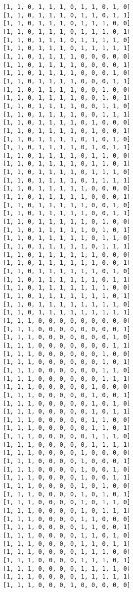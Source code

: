 \documentclass[11pt]{article}
\begin{document}
\begin{Verbatim}[commandchars=\\\{\}]
[1, 1, 0, 1, 1, 1, 0, 1, 1, 0, 1, 0]
[1, 1, 0, 1, 1, 1, 0, 1, 1, 0, 1, 1]
[1, 1, 0, 1, 1, 1, 0, 1, 1, 1, 0, 0]
[1, 1, 0, 1, 1, 1, 0, 1, 1, 1, 0, 1]
[1, 1, 0, 1, 1, 1, 0, 1, 1, 1, 1, 0]
[1, 1, 0, 1, 1, 1, 0, 1, 1, 1, 1, 1]
[1, 1, 0, 1, 1, 1, 1, 0, 0, 0, 0, 0]
[1, 1, 0, 1, 1, 1, 1, 0, 0, 0, 0, 1]
[1, 1, 0, 1, 1, 1, 1, 0, 0, 0, 1, 0]
[1, 1, 0, 1, 1, 1, 1, 0, 0, 0, 1, 1]
[1, 1, 0, 1, 1, 1, 1, 0, 0, 1, 0, 0]
[1, 1, 0, 1, 1, 1, 1, 0, 0, 1, 0, 1]
[1, 1, 0, 1, 1, 1, 1, 0, 0, 1, 1, 0]
[1, 1, 0, 1, 1, 1, 1, 0, 0, 1, 1, 1]
[1, 1, 0, 1, 1, 1, 1, 0, 1, 0, 0, 0]
[1, 1, 0, 1, 1, 1, 1, 0, 1, 0, 0, 1]
[1, 1, 0, 1, 1, 1, 1, 0, 1, 0, 1, 0]
[1, 1, 0, 1, 1, 1, 1, 0, 1, 0, 1, 1]
[1, 1, 0, 1, 1, 1, 1, 0, 1, 1, 0, 0]
[1, 1, 0, 1, 1, 1, 1, 0, 1, 1, 0, 1]
[1, 1, 0, 1, 1, 1, 1, 0, 1, 1, 1, 0]
[1, 1, 0, 1, 1, 1, 1, 0, 1, 1, 1, 1]
[1, 1, 0, 1, 1, 1, 1, 1, 0, 0, 0, 0]
[1, 1, 0, 1, 1, 1, 1, 1, 0, 0, 0, 1]
[1, 1, 0, 1, 1, 1, 1, 1, 0, 0, 1, 0]
[1, 1, 0, 1, 1, 1, 1, 1, 0, 0, 1, 1]
[1, 1, 0, 1, 1, 1, 1, 1, 0, 1, 0, 0]
[1, 1, 0, 1, 1, 1, 1, 1, 0, 1, 0, 1]
[1, 1, 0, 1, 1, 1, 1, 1, 0, 1, 1, 0]
[1, 1, 0, 1, 1, 1, 1, 1, 0, 1, 1, 1]
[1, 1, 0, 1, 1, 1, 1, 1, 1, 0, 0, 0]
[1, 1, 0, 1, 1, 1, 1, 1, 1, 0, 0, 1]
[1, 1, 0, 1, 1, 1, 1, 1, 1, 0, 1, 0]
[1, 1, 0, 1, 1, 1, 1, 1, 1, 0, 1, 1]
[1, 1, 0, 1, 1, 1, 1, 1, 1, 1, 0, 0]
[1, 1, 0, 1, 1, 1, 1, 1, 1, 1, 0, 1]
[1, 1, 0, 1, 1, 1, 1, 1, 1, 1, 1, 0]
[1, 1, 0, 1, 1, 1, 1, 1, 1, 1, 1, 1]
[1, 1, 1, 0, 0, 0, 0, 0, 0, 0, 0, 0]
[1, 1, 1, 0, 0, 0, 0, 0, 0, 0, 0, 1]
[1, 1, 1, 0, 0, 0, 0, 0, 0, 0, 1, 0]
[1, 1, 1, 0, 0, 0, 0, 0, 0, 0, 1, 1]
[1, 1, 1, 0, 0, 0, 0, 0, 0, 1, 0, 0]
[1, 1, 1, 0, 0, 0, 0, 0, 0, 1, 0, 1]
[1, 1, 1, 0, 0, 0, 0, 0, 0, 1, 1, 0]
[1, 1, 1, 0, 0, 0, 0, 0, 0, 1, 1, 1]
[1, 1, 1, 0, 0, 0, 0, 0, 1, 0, 0, 0]
[1, 1, 1, 0, 0, 0, 0, 0, 1, 0, 0, 1]
[1, 1, 1, 0, 0, 0, 0, 0, 1, 0, 1, 0]
[1, 1, 1, 0, 0, 0, 0, 0, 1, 0, 1, 1]
[1, 1, 1, 0, 0, 0, 0, 0, 1, 1, 0, 0]
[1, 1, 1, 0, 0, 0, 0, 0, 1, 1, 0, 1]
[1, 1, 1, 0, 0, 0, 0, 0, 1, 1, 1, 0]
[1, 1, 1, 0, 0, 0, 0, 0, 1, 1, 1, 1]
[1, 1, 1, 0, 0, 0, 0, 1, 0, 0, 0, 0]
[1, 1, 1, 0, 0, 0, 0, 1, 0, 0, 0, 1]
[1, 1, 1, 0, 0, 0, 0, 1, 0, 0, 1, 0]
[1, 1, 1, 0, 0, 0, 0, 1, 0, 0, 1, 1]
[1, 1, 1, 0, 0, 0, 0, 1, 0, 1, 0, 0]
[1, 1, 1, 0, 0, 0, 0, 1, 0, 1, 0, 1]
[1, 1, 1, 0, 0, 0, 0, 1, 0, 1, 1, 0]
[1, 1, 1, 0, 0, 0, 0, 1, 0, 1, 1, 1]
[1, 1, 1, 0, 0, 0, 0, 1, 1, 0, 0, 0]
[1, 1, 1, 0, 0, 0, 0, 1, 1, 0, 0, 1]
[1, 1, 1, 0, 0, 0, 0, 1, 1, 0, 1, 0]
[1, 1, 1, 0, 0, 0, 0, 1, 1, 0, 1, 1]
[1, 1, 1, 0, 0, 0, 0, 1, 1, 1, 0, 0]
[1, 1, 1, 0, 0, 0, 0, 1, 1, 1, 0, 1]
[1, 1, 1, 0, 0, 0, 0, 1, 1, 1, 1, 0]
[1, 1, 1, 0, 0, 0, 0, 1, 1, 1, 1, 1]
[1, 1, 1, 0, 0, 0, 1, 0, 0, 0, 0, 0]

\end{Verbatim}
\end{document}
